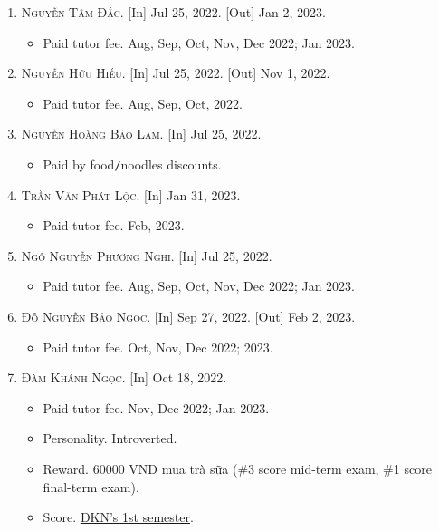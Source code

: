 \documentclass{article}
\numberwithin{equation}{section}
\begin{document}
\begin{enumerate}
	\item \textsc{Nguyễn Tâm Đắc.} \textsf{[In]} Jul 25, 2022. \textsf{[Out]} Jan 2, 2023.
	\begin{itemize}
		\item \textsf{Paid tutor fee.} Aug, Sep, Oct, Nov, Dec 2022; Jan 2023.
	\end{itemize}
	\item \textsc{Nguyễn Hữu Hiếu.} \textsf{[In]} Jul 25, 2022. \textsf{[Out]} Nov 1, 2022.
	\begin{itemize}
		\item \textsf{Paid tutor fee.} Aug, Sep, Oct, 2022.
	\end{itemize}
	\item \textsc{Nguyễn Hoàng Bảo Lam.} \textsf{[In]} Jul 25, 2022.
	\begin{itemize}
		\item \textsf{Paid by food\texttt{/}noodles discounts.}
	\end{itemize}
	\item \textsc{Trần Văn Phát Lộc.} \textsf{[In]} Jan 31, 2023.
	\begin{itemize}
		\item \textsf{Paid tutor fee.} Feb, 2023.
	\end{itemize}
	\item \textsc{Ngô Nguyễn Phương Nghi.} \textsf{[In]} Jul 25, 2022.
	\begin{itemize}
		\item \textsf{Paid tutor fee.} Aug, Sep, Oct, Nov, Dec 2022; Jan 2023.
	\end{itemize}
	\item \textsc{Đỗ Nguyễn Bảo Ngọc.} \textsf{[In]} Sep 27, 2022. \textsf{[Out]} Feb 2, 2023.
	\begin{itemize}
		\item \textsf{Paid tutor fee.} Oct, Nov, Dec 2022; 2023.
	\end{itemize}
	\item \textsc{Đàm Khánh Ngọc.} \textsf{[In]} Oct 18, 2022.
	\begin{itemize}
		\item \textsf{Paid tutor fee.} Nov, Dec 2022; Jan 2023.
		\item \textsf{Personality.} Introverted.
		\item \textsf{Reward.} 60000 VND mua trà sữa (\#3 score mid-term exam, \#1 score final-term exam).
		\item \textsf{Score.} \href{https://github.com/NQBH/hobby/blob/master/STEM/student/Dam_Khanh_Ngoc_grade_6_1st_semester.jpg}{DKN's 1st semester}.

\end{itemize}
\end{enumerate}
\end{document}
